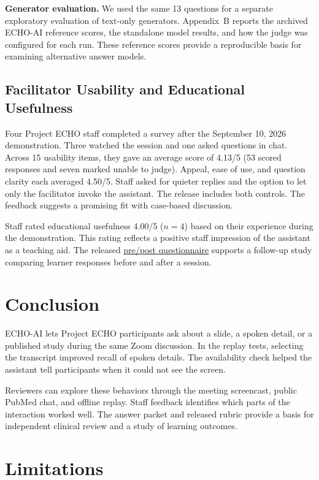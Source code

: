 \documentclass[11pt]{article}
\begin{document}
\textbf{Generator evaluation.} We used the same 13 questions for a separate exploratory evaluation of text-only generators. Appendix~B reports the archived ECHO-AI reference scores, the standalone model results, and how the judge was configured for each run. These reference scores provide a reproducible basis for examining alternative answer models.

\subsection{Facilitator Usability and Educational Usefulness}

Four Project ECHO staff completed a survey after the September 10, 2026 demonstration. Three watched the session and one asked questions in chat. Across 15 usability items, they gave an average score of 4.13/5 (53 scored responses and seven marked unable to judge). Appeal, ease of use, and question clarity each averaged 4.50/5. Staff asked for quieter replies and the option to let only the facilitator invoke the assistant. The release includes both controls. The feedback suggests a promising fit with case-based discussion.

Staff rated educational usefulness 4.00/5 ($n{=}4$) based on their experience during the demonstration. This rating reflects a positive staff impression of the assistant as a teaching aid. The released \href{https://github.com/238Plutonium/openreview/tree/main/evaluation/education_outcomes}{pre/post questionnaire} supports a follow-up study comparing learner responses before and after a session.

\section{Conclusion}

ECHO-AI lets Project ECHO participants ask about a slide, a spoken detail, or a published study during the same Zoom discussion. In the replay tests, selecting the transcript improved recall of spoken details. The availability check helped the assistant tell participants when it could not see the screen.

Reviewers can explore these behaviors through the meeting screencast, public PubMed chat, and offline replay. Staff feedback identifies which parts of the interaction worked well. The answer packet and released rubric provide a basis for independent clinical review and a study of learning outcomes.

\section*{Limitations}
\end{document}
